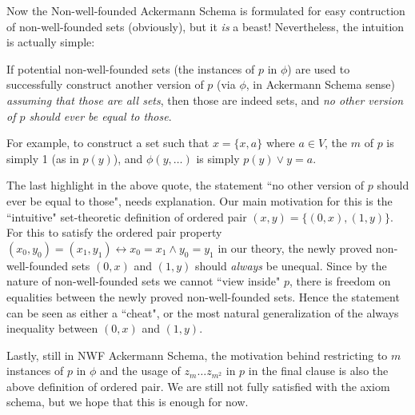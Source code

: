 \documentclass{article}
\begin{document}
Now the Non-well-founded Ackermann Schema is formulated for easy contruction of non-well-founded sets (obviously), but it \textit{is} a beast! Nevertheless, the intuition is actually simple:

\begin{displayquote}
If potential non-well-founded sets (the instances of $p$ in $\phi$) are used to successfully construct another version of $p$ (via $\phi$, in Ackermann Schema sense) \textit{assuming that those are all sets}, then those are indeed sets, and \textit{no other version of $p$ should ever be equal to those}.
\end{displayquote}

For example, to construct a set such that $x=\{x, a\}$ where $a \in V$, the $m$ of $p$ is simply 1 (as in $p(y)$), and $\phi(y, \ldots)$ is simply $p(y) \vee y = a$.

The last highlight in the above quote, the statement ``no other version of $p$ should ever be equal to those", needs explanation. Our main motivation for this is the ``intuitive" set-theoretic definition of ordered pair $(x,y) = \{(0,x), (1, y)\}$. For this to satisfy the ordered pair property $(x_0,y_0) = (x_1, y_1) \leftrightarrow x_0 = x_1 \wedge y_0 = y_1$ in our theory, the newly proved non-well-founded sets $(0,x)$ and $(1,y)$ should \textit{always} be unequal. Since by the nature of non-well-founded sets we cannot ``view inside" $p$, there is freedom on equalities between the newly proved non-well-founded sets. Hence the statement can be seen as either a ``cheat", or the most natural generalization of the always inequality between $(0,x)$ and $(1,y)$.

Lastly, still in NWF Ackermann Schema, the motivation behind restricting to $m$ instances of $p$ in $\phi$ and the usage of $z_m \ldots z_{m^2}$ in $p$ in the final clause is also the above definition of ordered pair. We are still not fully satisfied with the axiom schema, but we hope that this is enough for now.



\end{document}
